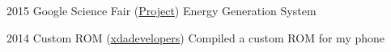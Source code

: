 \documentclass{tccv}
\begin{document}
\begin{yearlist}

\item{2015}
     {Google Science Fair (\href{https://www.googlesciencefair.com/projects/en/2015/01ce2a5097227cd2bf078607d16fc07fb6949b23961a011cd0bda6d0c2fb011a}{Project})}
     {Energy Generation System}

\item{2014}
     {Custom ROM (\href{https://forum.xda-developers.com/showthread.php?t=2756571}{xdadevelopers})}
     {Compiled a custom ROM for my phone}


\end{yearlist}
\end{document}
